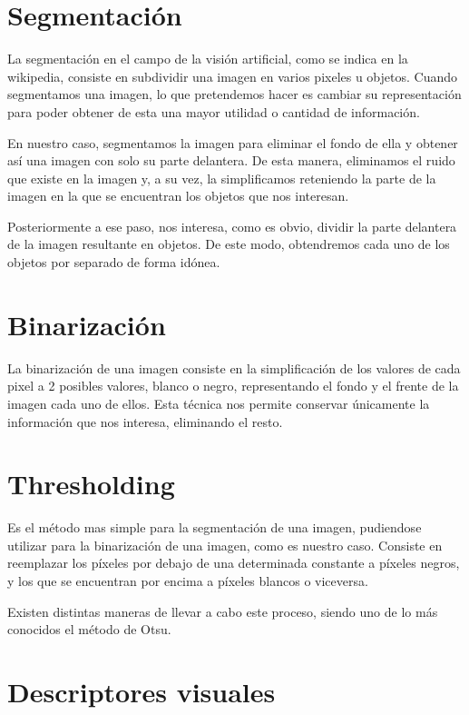 \section{Segmentación}

La segmentación en el campo de la visión artificial, como se indica en la wikipedia, consiste en subdividir una imagen en varios pixeles u objetos. \cite{wiki:segmentation}
Cuando segmentamos una imagen, lo que pretendemos hacer es cambiar su representación para poder obtener de esta una mayor utilidad o cantidad de información.

En nuestro caso, segmentamos la imagen para eliminar el fondo de ella y obtener así una imagen con solo su parte delantera. De esta manera, eliminamos el ruido que existe en la imagen y, a su vez, la simplificamos reteniendo la parte de la imagen en la que se encuentran los objetos que nos interesan.

Posteriormente a ese paso, nos interesa, como es obvio, dividir la parte delantera de la imagen resultante en objetos. De este modo, obtendremos cada uno de los objetos por separado de forma idónea.

\section{Binarización}

La binarización de una imagen consiste en la simplificación de los valores de cada pixel a 2 posibles valores, blanco o negro, representando el fondo y el frente de la imagen cada uno de ellos. Esta técnica nos permite conservar únicamente la información que nos interesa, eliminando el resto.

\section{Thresholding}

Es el método mas simple para la segmentación de una imagen, pudiendose utilizar para la binarización de una imagen, como es nuestro caso. Consiste en reemplazar los píxeles por debajo de una determinada constante a píxeles negros, y los que se encuentran por encima a píxeles blancos o viceversa.

Existen distintas maneras de llevar a cabo este proceso, siendo uno de lo más conocidos el método de Otsu. \cite{wiki:otsu}

\section{Descriptores visuales}


